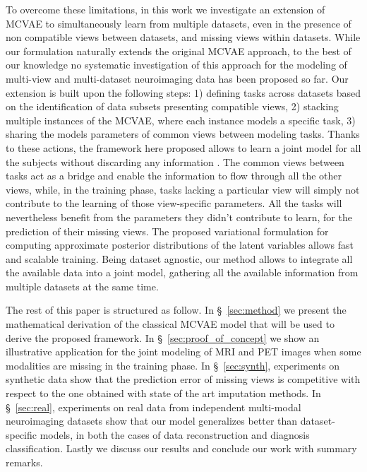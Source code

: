 To overcome these limitations, in this work we investigate an extension of MCVAE to simultaneously learn from multiple datasets, even in the presence of non compatible views between datasets, and missing views within datasets.
While our formulation naturally extends the original MCVAE approach,
to the best of our knowledge no systematic investigation of this approach for the modeling of multi-view and multi-dataset neuroimaging data has been proposed so far.
Our extension is built upon the following steps:
1) defining tasks across datasets based on the identification of data subsets presenting compatible views,
2) stacking multiple instances of the MCVAE, where each instance models a specific task,
3) sharing the models parameters of common views between modeling tasks.
%
Thanks to these actions, the framework here proposed allows to learn a joint model for all the subjects without discarding any information .
The common views between tasks act as a bridge and enable the information to flow through all the other views,
while, in the training phase, tasks lacking a particular view will simply not contribute to the learning of those view-specific parameters.
All the tasks will nevertheless benefit from the parameters they didn't contribute to learn, for the prediction of their missing views.
The proposed variational formulation for computing approximate posterior distributions of the latent variables allows fast and scalable training.
Being dataset agnostic, our method allows to integrate all the available data into a joint model, gathering  all the available information from multiple datasets at the same time.

The rest of this paper is structured as follow.
In \S~\ref{sec:method} we present the mathematical derivation of the classical MCVAE model that will be used to derive the proposed framework.
In \S~\ref{sec:proof_of_concept} we show an illustrative application for the joint modeling of MRI and PET images when some modalities are missing in the training phase.
In \S~\ref{sec:synth}, experiments on synthetic data show that the prediction error of missing views is competitive with respect to the one obtained with state of the art imputation methods.
In \S~\ref{sec:real}, experiments on real data from independent multi-modal neuroimaging datasets show that our model generalizes better than dataset-specific models, in both the cases of data reconstruction and diagnosis classification.
Lastly we discuss our results and conclude our work with summary remarks.


